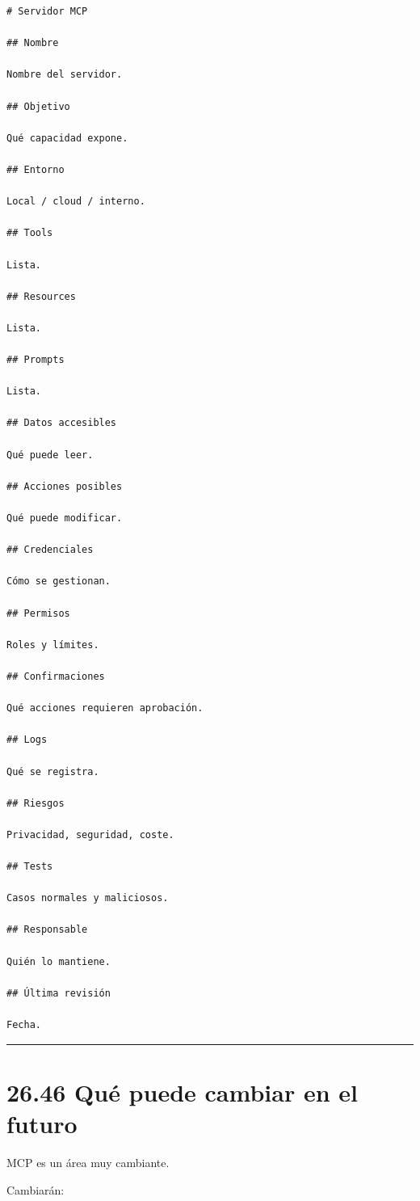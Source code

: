 \begin{lstlisting}
# Servidor MCP

## Nombre

Nombre del servidor.

## Objetivo

Qué capacidad expone.

## Entorno

Local / cloud / interno.

## Tools

Lista.

## Resources

Lista.

## Prompts

Lista.

## Datos accesibles

Qué puede leer.

## Acciones posibles

Qué puede modificar.

## Credenciales

Cómo se gestionan.

## Permisos

Roles y límites.

## Confirmaciones

Qué acciones requieren aprobación.

## Logs

Qué se registra.

## Riesgos

Privacidad, seguridad, coste.

## Tests

Casos normales y maliciosos.

## Responsable

Quién lo mantiene.

## Última revisión

Fecha.
\end{lstlisting}

\begin{center}\rule{0.5\linewidth}{0.5pt}\end{center}

\section{26.46 Qué puede cambiar en el
futuro}\label{quuxe9-puede-cambiar-en-el-futuro-25}

MCP es un área muy cambiante.

Cambiarán:

